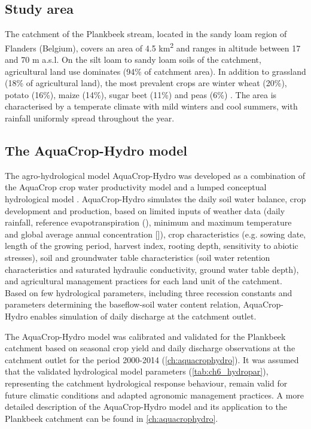 \subsection{Study area}
The catchment of the Plankbeek stream, located in the sandy loam region of Flanders (Belgium), covers an area of 4.5 \si{km^2} and ranges in altitude between 17 and 70 m a.s.l. On the silt loam to sandy loam soils of the catchment, agricultural land use dominates (94\% of catchment area). In addition to grassland (18\% of  agricultural land), the most prevalent crops are winter wheat (20\%), potato (16\%), maize (14\%), sugar beet (11\%) and peas (6\%) \parencite{agiv2014, agiv2001, vlm2014}. The area is characterised by a temperate climate with mild winters and cool summers, with rainfall uniformly spread throughout the year.

\subsection{The AquaCrop-Hydro model}
The agro-hydrological model AquaCrop-Hydro was developed as a combination of the AquaCrop crop water productivity model \parencite{hsiao2009,steduto2009,raes2009,vanuytrecht2014} and a lumped conceptual hydrological model \parencite{willems2014,willems2014a}. AquaCrop-Hydro simulates the daily soil water balance, crop development and production, based on limited inputs of weather data (daily rainfall, reference evapotranspiration (\ETo), minimum and maximum temperature and global average annual \COtwo concentration [\COtwo]), crop characteristics (e.g. sowing date, length of the growing period, harvest index, rooting depth, sensitivity to abiotic stresses), soil and groundwater table characteristics (soil water retention characteristics and saturated hydraulic conductivity, ground water table depth), and agricultural management practices for each land unit of the catchment. Based on few hydrological parameters, including three recession constants and parameters determining the baseflow-soil water content relation, AquaCrop-Hydro enables simulation of daily discharge at the catchment outlet. 

The AquaCrop-Hydro model was calibrated and validated for the Plankbeek catchment based on seasonal crop yield and daily discharge observations at the catchment outlet for the period 2000-2014 (\autoref{ch:aquacrophydro}). It was assumed that the validated hydrological model parameters (\autoref{tab:ch6_hydropar}), representing the catchment hydrological response behaviour, remain valid for future climatic conditions and adapted agronomic management practices. A more detailed description of the AquaCrop-Hydro model and its application to the Plankbeek catchment can be found in \autoref{ch:aquacrophydro}.

